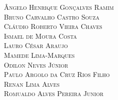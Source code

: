 {%
\textsc{Ângelo Henrique Gonçalves Ramim} \\
\textsc{Bruno Carvalho Castro Souza} \\
\textsc{Cláudio Roberto Vieira Chaves} \\
\textsc{Ismael de Moura Costa} \\
\textsc{Lauro César Araujo} \\
\textsc{Mamede Lima-Marques} \\
\textsc{Odilon Neves Júnior} \\
\textsc{Paulo Argolo da Cruz Rios Filho} \\
\textsc{Renan Lima Alves} \\
\textsc{Romualdo Alves Pereira Junior} \\










}


